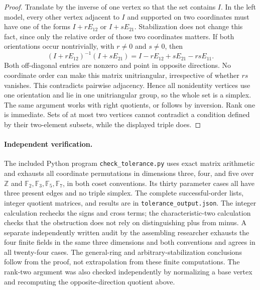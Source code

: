 \begin{proof}
Translate by the inverse of one vertex so that the set contains \(I\).
In the left model, every other vertex adjacent to \(I\) and supported
on two coordinates must have one of the forms
\(I+rE_{12}\) or \(I+sE_{21}\). Stabilization does not change this
fact, since only the relative order of those two coordinates matters.
If both orientations occur nontrivially, with \(r\ne0\) and \(s\ne0\),
then
\[
 (I+rE_{12})^{-1}(I+sE_{21})
       =I-rE_{12}+sE_{21}-rsE_{11}.
\]
Both off-diagonal entries are nonzero and point in opposite directions.
No coordinate order can make this matrix unitriangular, irrespective of
whether \(rs\) vanishes. This contradicts pairwise adjacency.
Hence all nonidentity vertices use one orientation and lie in one
unitriangular group, so the whole set is a simplex. The same argument
works with right quotients, or follows by inversion. Rank one is
immediate. Sets of at most two vertices cannot contradict a condition
defined by their two-element subsets, while the displayed triple does.
\end{proof}

\paragraph{Independent verification.}\oursComputed
The included Python program \texttt{check\_tolerance.py} uses exact
matrix arithmetic and exhausts all coordinate permutations in dimensions
three, four, and five over \(\mathbb Z\) and
\(\mathbb F_2,\mathbb F_3,\mathbb F_5,\mathbb F_7\), in both coset
conventions. Its thirty parameter cases all have three present edges
and no triple simplex. The complete successful-order lists, integer
quotient matrices, and results are in \texttt{tolerance\_output.json}.
The integer calculation rechecks the signs and cross terms; the
characteristic-two calculation checks that the obstruction does not
rely on distinguishing plus from minus. A separate independently
written audit by the assembling researcher exhausts the four finite
fields in the same three dimensions and both conventions and agrees in
all twenty-four cases. The general-ring and arbitrary-stabilization
conclusions follow from the proof, not extrapolation from these finite
computations. The rank-two argument was also checked independently by
normalizing a base vertex and recomputing the opposite-direction
quotient above.

